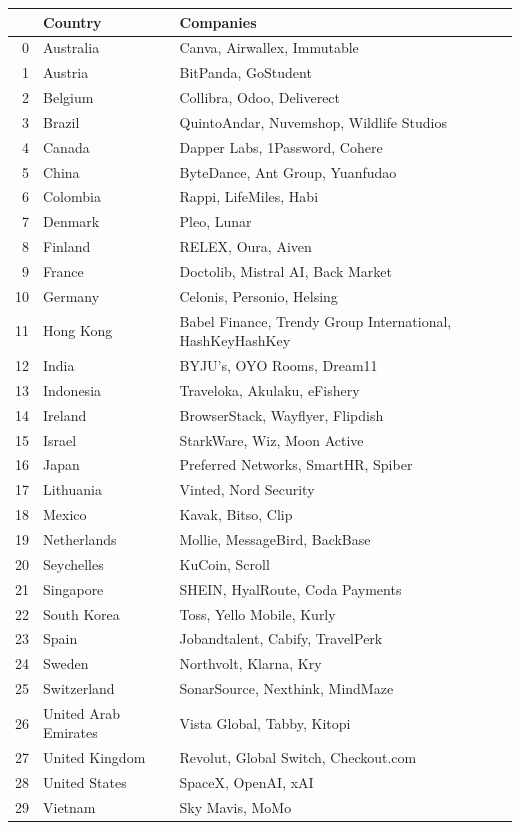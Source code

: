 \documentclass[a4paper,12pt]{article}
\begin{document}
\begin{table}[htbp]
\label{}
\centering
\begin{tabular}{rll}
 & Country & Companies\\
\hline
0 & Australia & Canva, Airwallex, Immutable\\
1 & Austria & BitPanda, GoStudent\\
2 & Belgium & Collibra, Odoo, Deliverect\\
3 & Brazil & QuintoAndar, Nuvemshop, Wildlife Studios\\
4 & Canada & Dapper Labs, 1Password, Cohere\\
5 & China & ByteDance, Ant Group, Yuanfudao\\
6 & Colombia & Rappi, LifeMiles, Habi\\
7 & Denmark & Pleo, Lunar\\
8 & Finland & RELEX, Oura, Aiven\\
9 & France & Doctolib, Mistral AI, Back Market\\
10 & Germany & Celonis, Personio, Helsing\\
11 & Hong Kong & Babel Finance, Trendy Group International, HashKeyHashKey\\
12 & India & BYJU's, OYO Rooms, Dream11\\
13 & Indonesia & Traveloka, Akulaku, eFishery\\
14 & Ireland & BrowserStack, Wayflyer, Flipdish\\
15 & Israel & StarkWare, Wiz, Moon Active\\
16 & Japan & Preferred Networks, SmartHR, Spiber\\
17 & Lithuania & Vinted, Nord Security\\
18 & Mexico & Kavak, Bitso, Clip\\
19 & Netherlands & Mollie, MessageBird, BackBase\\
20 & Seychelles & KuCoin, Scroll\\
21 & Singapore & SHEIN, HyalRoute, Coda Payments\\
22 & South Korea & Toss, Yello Mobile, Kurly\\
23 & Spain & Jobandtalent, Cabify, TravelPerk\\
24 & Sweden & Northvolt, Klarna, Kry\\
25 & Switzerland & SonarSource, Nexthink, MindMaze\\
26 & United Arab Emirates & Vista Global, Tabby, Kitopi\\
27 & United Kingdom & Revolut, Global Switch, Checkout.com\\
28 & United States & SpaceX, OpenAI, xAI\\
29 & Vietnam & Sky Mavis, MoMo\\
\end{tabular}
\end{table}
\end{document}
